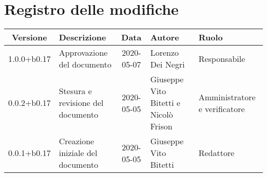 \section*{Registro delle modifiche}

\begin{center}
	\begin{longtable}{|c|p{3.5cm}|c|p{3cm}|p{3cm}|}
	\hline
	\rowcolor{lighter-grayer}
	\textbf{Versione} & \textbf{Descrizione} & \textbf{Data} & \textbf{Autore} & \textbf{Ruolo} \\
	\hline
	\endfirsthead


	1.0.0+b0.17 & Approvazione del documento & 2020-05-07 & Lorenzo Dei Negri & Responsabile \\
	\hline
	0.0.2+b0.17 & Stesura e revisione del documento & 2020-05-05 & Giuseppe Vito Bitetti e Nicolò Frison & Amministratore e verificatore \\
	\hline
	0.0.1+b0.17 & Creazione iniziale del documento & 2020-05-05 & Giuseppe Vito Bitetti & Redattore \\
	\hline
	\end{longtable}
\end{center}
